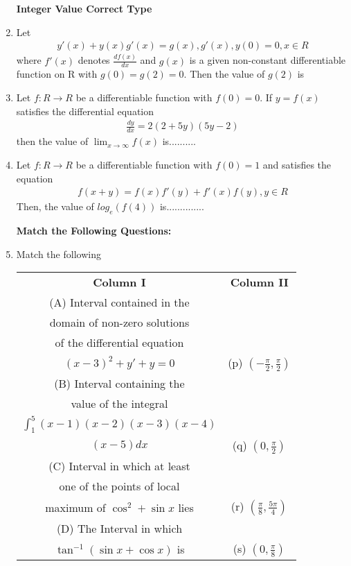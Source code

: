 \begin{enumerate}[label=\arabic*.,ref=\thesubsection.\theenumi]
\textbf{Integer Value Correct Type}

\item Let
\begin{align*}
y'(x) + y(x)g'(x) = g(x), g'(x), y(0) = 0, x \in R 
\end{align*}
where $f'(x)$ denotes $\frac{df(x)}{dx}$ and $g(x)$ is a given non-constant differentiable function on R with $g(0) = g(2) = 0$. Then the value of $g(2)$ is

\item Let $f: R \to R$ be a differentiable function with $f(0) = 0$. If $y = f(x)$ satisfies the differential equation
\begin{align*}
\frac{dy}{dx} = 2(2 + 5y)(5y - 2)
\end{align*}  
then the value of $\lim_{x \to \infty}f(x)$ is..........

\item Let $f: R \to R$ be a differentiable function with $f(0) = 1$ and satisfies the equation 
\begin{align*}
f(x + y) = f(x)f'(y) + f'(x)f(y), y \in R 
\end{align*}
Then, the value of $log_e(f(4))$ is..............

\clearpage

\textbf{Match the Following Questions:}

\item Match the following
\begin{table}[ht!]
\centering
\begin{tabular}{c c} 
 \textbf{Column I} & \textbf{Column II}\\ [0.5ex] 
 (A) Interval contained in the\\ domain of
     non-zero solutions\\ of the differential equation\\
     $(x - 3)^2 + y' + y = 0$                                     &(p) $\left(-\frac{\pi}{2}, \frac{\pi}{2}\right)$\\ 
 (B) Interval containing the\\ value of the integral\\
     $\int_{1}^{5}(x-1)(x-2)(x-3)(x-4)$\\ $(x-5)dx$                    &(q) $\left(0, \frac{\pi}{2}\right)$\\
 (C) Interval in which at least\\ one of the points of
     local\\ maximum of $\cos^{2} + \sin x$ lies                    &(r) $\left(\frac{\pi}{8}, \frac{5\pi}{4}\right)$\\                                                                     
 (D) The Interval in which\\ $\tan^{-1}(\sin x + \cos x)$ is            &(s) $\left(0, \frac{\pi}{8}\right)$\\[1ex] 
\end{tabular}
\end{table}
\end{enumerate}

